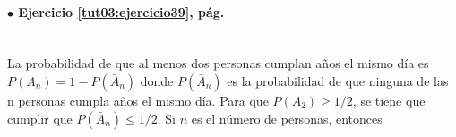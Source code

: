 \documentclass[10pt,a4paper]{article}\usepackage[]{graphicx}\usepackage[]{color}
\begin{document}

\paragraph{\bf $\bullet$ Ejercicio \ref{tut03:ejercicio39}, pág. \pageref{tut03:ejercicio39}}
\label{tut03:ejercicio39:sol}\quad\\
 La probabilidad de que al menos dos personas cumplan a\~nos el mismo d\'ia es $P(A_n)=1-P(\bar A_n)$
    donde $P(\bar A_n)$ es la probabilidad de que ninguna de las n personas cumpla años el mismo día. 
    Para que $P(A_2) \geq 1/2$, se tiene que cumplir que $P(\bar A_n) \leq 1/2$. Si $n$ es el n\'umero de personas, entonces
\end{document}
